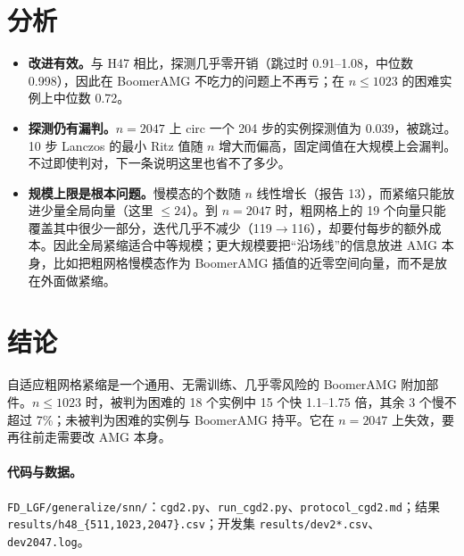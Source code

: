 \documentclass[11pt,a4paper]{ctexart}
\begin{document}
\section{分析}
\begin{itemize}
\item \textbf{改进有效。}与 H47 相比，探测几乎零开销（跳过时 0.91--1.08，中位数 0.998），因此在 BoomerAMG 不吃力的问题上不再亏；在 $n\le1023$ 的困难实例上中位数 0.72。
\item \textbf{探测仍有漏判。}$n=2047$ 上 circ 一个 204 步的实例探测值为 0.039，被跳过。10 步 Lanczos 的最小 Ritz 值随 $n$ 增大而偏高，固定阈值在大规模上会漏判。不过即使判对，下一条说明这里也省不了多少。
\item \textbf{规模上限是根本问题。}慢模态的个数随 $n$ 线性增长（报告 13），而紧缩只能放进少量全局向量（这里 $\le24$）。到 $n=2047$ 时，粗网格上的 19 个向量只能覆盖其中很少一部分，迭代几乎不减少（119$\to$116），却要付每步的额外成本。因此全局紧缩适合中等规模；更大规模要把“沿场线”的信息放进 AMG 本身，比如把粗网格慢模态作为 BoomerAMG 插值的近零空间向量，而不是放在外面做紧缩。
\end{itemize}

\section{结论}
自适应粗网格紧缩是一个通用、无需训练、几乎零风险的 BoomerAMG 附加部件。$n\le1023$ 时，被判为困难的 18 个实例中 15 个快 1.1--1.75 倍，其余 3 个慢不超过 7\%；未被判为困难的实例与 BoomerAMG 持平。它在 $n=2047$ 上失效，要再往前走需要改 AMG 本身。
\paragraph{代码与数据。}\texttt{FD\_LGF/generalize/snn/}：\texttt{cgd2.py}、\texttt{run\_cgd2.py}、\texttt{protocol\_cgd2.md}；结果 \texttt{results/h48\_\{511,1023,2047\}.csv}；开发集 \texttt{results/dev2*.csv}、\texttt{dev2047.log}。
\end{document}
